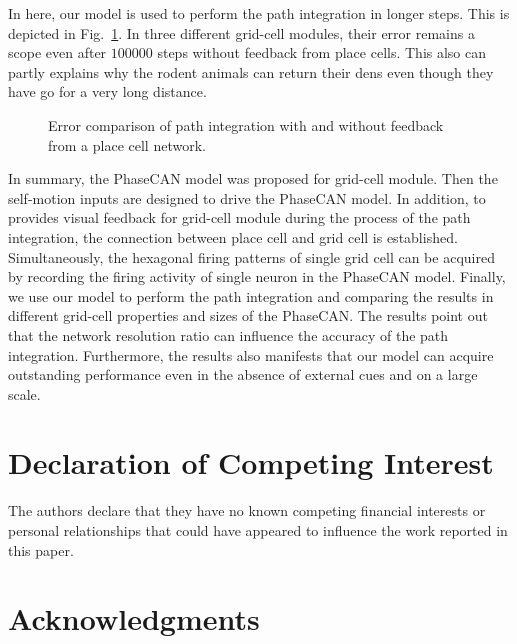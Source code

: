 \documentclass[final,5p,times,twocolumn,authoryear]{elsarticle}
\begin{document}
In here, our model is used to perform the path integration in longer steps. This is depicted in Fig.~\ref{fig:path_integration_long}. In three different grid-cell modules, their error remains a scope even after $100000$ steps without feedback from place cells. This also can partly explains why the rodent animals can return their dens even though they have go for a very long distance. 
\begin{figure}[t]
	\centering
	\caption{Error comparison of path integration with and without feedback from a place cell network.  }
	\label{fig:path_integration_long}
\end{figure}

In summary, the PhaseCAN model was proposed for grid-cell module. Then the self-motion inputs are designed to drive the PhaseCAN model. In addition, to provides visual feedback for grid-cell module during the process of the path integration, the connection between place cell and grid cell is established. Simultaneously, the hexagonal firing patterns of single grid cell can be acquired by recording the firing activity of single neuron in the PhaseCAN model. Finally, we use our model to perform the path integration and comparing the results in different grid-cell properties and sizes of the PhaseCAN. The results point out that the network resolution ratio can influence the accuracy of the path integration. Furthermore, the results also manifests that our model can acquire outstanding performance even in the absence of external cues and on a large scale.
\section{Declaration of Competing Interest}
The authors declare that they have no known competing financial interests or personal relationships that could have appeared to influence the work reported in this paper.
\section{Acknowledgments}
\end{document}
